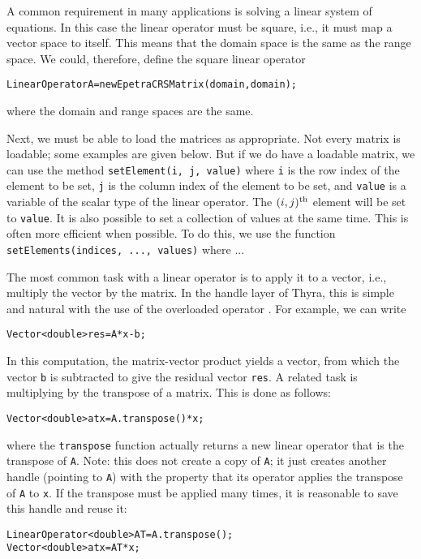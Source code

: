 \documentclass[12pt]{article}
\newcommand{\thyra}{{\sf Thyra}}
\newcommand{\lcode}[1]{{\tt #1}}
\newenvironment{dcode}{  \begin{center} 
    \begin{minipage}{.9\textwidth}
     \begin{alltt}}
{\end{alltt}
    \end{minipage}
  \end{center}}
\newcommand{\bdcode}{\begin{dcode}}
\newcommand{\edcode}{\end{dcode}}
\begin{document}
A common
requirement in  many
applications is solving a linear system of equations.  In this case
the linear operator must be square, i.e., it must map a vector space
to itself.  This means that the domain space is the same as the range
space. We could, therefore, define the square linear operator
\bdcode
LinearOperator A = new EpetraCRSMatrix(domain, domain);
\edcode
where the domain and range spaces are the same.

Next, we must be able to load the matrices as appropriate.  Not every
matrix is loadable; some examples are given below.  But if we do have
a loadable matrix, we can use the method \lcode{setElement(i, j,
  value)} where \lcode{i} is the row index of the element to be set,
\lcode{j} is the column index of the element to be set, and
\lcode{value} is a variable of the scalar type of the linear operator.
The $(i, j)^{\rm th}$ element will be set to \lcode{value}.  It is
also possible to set a collection of values at the same time.  This is
often more efficient when possible.  To do this, we use
the function \lcode{setElements(indices, ..., values)} where ... 

The most common task with a linear operator is to apply it to a
vector, i.e., multiply the vector by the matrix.  In the handle layer
of \thyra, this is simple and natural with the use of the overloaded
operator \lcode{*}. For example, we can write
\bdcode
Vector<double> res = A * x - b;
\edcode
In this computation, the matrix-vector product yields a vector, from which
the vector \lcode{b} is subtracted to give the residual vector \lcode{res}.
A related task is multiplying by the transpose of a matrix.  This is
done as follows:
\bdcode
Vector<double> atx = A.transpose() * x;
\edcode
where the \lcode{transpose} function actually returns a new linear
operator that is the transpose of \lcode{A}.  Note: this does not
create a copy of \lcode{A}; it just creates another handle (pointing
to \lcode{A}) with the property that its \lcode{*} operator applies
the transpose of \lcode{A} to \lcode{x}.  If the transpose must be
applied many times, it is reasonable to save this handle and reuse it:
\bdcode
LinearOperator<double> AT = A.transpose(); 
Vector<double> atx = AT * x;
\edcode
\end{document}
